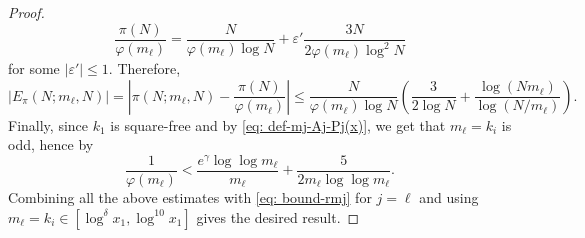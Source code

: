 \documentclass[12pt]{amsart}
\begin{document}
\begin{proof}
    \begin{equation*}
        \frac{\pi(N)}{\varphi(m_{\ell})}=\frac{N}{\varphi(m_\ell)\log N}+\varepsilon' \frac{3N}{2 \varphi(m_{\ell})\log^2 N}
    \end{equation*}
    for some $|\varepsilon'| \le 1$. Therefore,
    \begin{equation*}
        |E_{\pi}(N; m_{\ell}, N)| = \left|\pi(N;m_\ell,N)-\frac{\pi(N)}{\varphi(m_\ell)}\right|\le\frac{N}{\varphi(m_\ell)\log N}\left(\frac{3}{2\log N}+\frac{\log(Nm_\ell)}{\log(N/m_\ell)}\right).
    \end{equation*}
    Finally, since $k_1$ is square-free and by \eqref{eq: def-mj-Aj-Pj(x)}, we get that $m_\ell=k_i$ is odd, hence by \cite[Theorem 15]{R-S}
    \begin{equation*}
        \frac{1}{\varphi(m_\ell)}<\frac{e^\gamma\log\log m_\ell}{m_\ell}+\frac{5}{2m_\ell\log\log m_\ell}.
    \end{equation*}
    Combining all the above estimates with \eqref{eq: bound-rmj} for $j = \ell$ and using $m_\ell=k_i\in[\log^\delta x_1,\log^{10}x_1]$ gives the desired result.
\end{proof}
\end{document}
